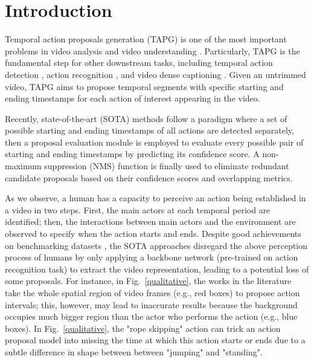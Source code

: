 \documentclass{bmvc2k}
\begin{document}
\section{Introduction}
\label{sec:intro}


Temporal action proposals generation (TAPG) is one of the most important problems in video analysis and video understanding \cite{anchor_2, Jiyang2017, CTAP, Gao_2018_CVPR}. Particularly, TAPG is the fundamental step for other downstream tasks, including temporal action detection \cite{caba2015activitynet, THUMOS14}, action recognition \cite{Kinetics}, and video dense captioning \cite{krishna2017dense}. Given an untrimmed video, TAPG aims to propose temporal segments with specific starting and ending timestamps for each action of interest appearing in the video.

Recently, state-of-the-art (SOTA) methods \cite{lin2018bsn, bmn, BSN++, dbg} follow a paradigm where a set of possible starting and ending timestamps of all actions are detected separately, then a proposal evaluation module is employed to evaluate every possible pair of starting and ending timestamps by predicting its confidence score. A non-maximum suppression (NMS) \cite{NMS, SoftNMS} function is finally used to eliminate redundant candidate proposals based on their confidence scores and overlapping metrics.

As we observe, a human has a capacity to perceive an action being established in a video \cite{cognitive2, cognitive_vision} in two steps. First, the main actors at each temporal period are identified; then, the interactions between main actors and the environment are observed to specify when the action starts and ends. Despite good achievements on benchmarking datasets \cite{caba2015activitynet, THUMOS14}, the SOTA approaches \cite{bmn, BSN++, dbg} disregard the above perception process of humans by only applying a backbone network (pre-trained on action recognition task) to extract the video representation, leading to a potential loss of some proposals. For instance, in Fig.~\ref{qualitative}, the works in the literature take the whole spatial region of video frames (e.g., red boxes) to propose action intervals; this, however, may lead to inaccurate results because the background occupies much bigger region than the actor who performs the action (e.g., blue boxes). In Fig.~\ref{qualitative}, the "rope skipping" action can trick an action proposal model into missing the time at which this action starts or ends due to a subtle difference in shape between between "jumping" and "standing".
\end{document}
